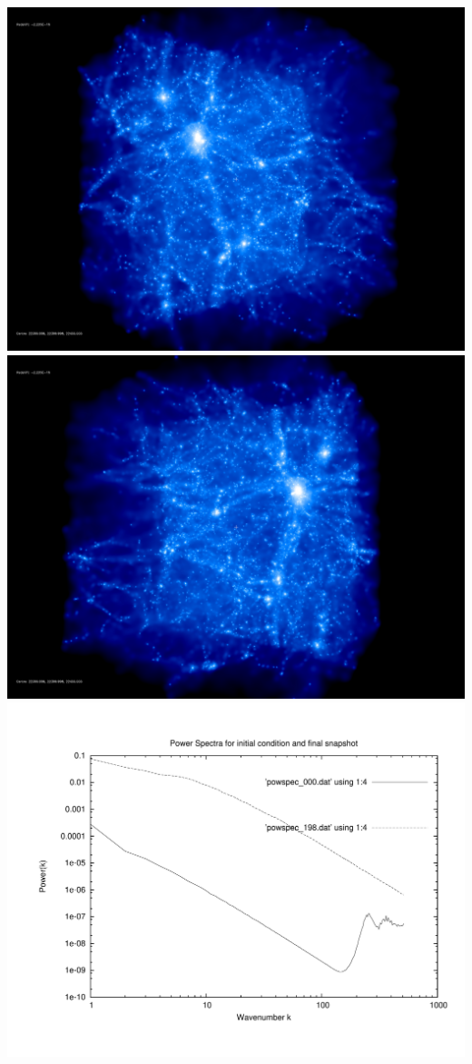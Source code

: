 \includegraphics[scale=0.1]{stages51_ling/rotate_00074.jpg} 
\includegraphics[scale=0.1]{stages51_ling/rotate_00131.jpg}  \\

\includegraphics[scale=0.5]{stages51_ling/plot_powspec_stages51_ling}

